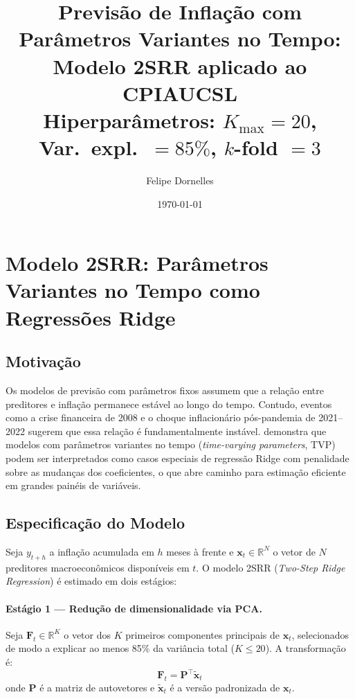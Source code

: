 \documentclass[12pt, a4paper]{article}
\begin{document}
\title{\textbf{Previsão de Inflação com Parâmetros Variantes no Tempo:\\
       Modelo 2SRR aplicado ao CPIAUCSL}\\[0.5em]
       \large Hiperparâmetros: $K_{\max}=20$,
       Var.\ expl.\ $= 85\%$, $k$-fold $= 3$}
\author{Felipe Dornelles}
\date{\today}
\maketitle
\tableofcontents
\newpage

\section{Modelo 2SRR: Parâmetros Variantes no Tempo como Regressões Ridge}
\label{sec:2srr}

\subsection{Motivação}

Os modelos de previsão com parâmetros fixos assumem que a relação entre
preditores e inflação permanece estável ao longo do tempo. Contudo,
eventos como a crise financeira de 2008 e o choque inflacionário
pós-pandemia de 2021--2022 sugerem que essa relação é fundamentalmente
instável. \citet{Coulombe2021} demonstra que modelos com parâmetros
variantes no tempo (\textit{time-varying parameters}, TVP) podem ser
interpretados como casos especiais de regressão Ridge com penalidade
sobre as mudanças dos coeficientes, o que abre caminho para estimação
eficiente em grandes painéis de variáveis.

\subsection{Especificação do Modelo}

Seja $y_{t+h}$ a inflação acumulada em $h$ meses à frente e
$\mathbf{x}_t \in \mathbb{R}^N$ o vetor de $N$ preditores
macroeconômicos disponíveis em $t$. O modelo 2SRR
(\textit{Two-Step Ridge Regression}) é estimado em dois estágios:

\paragraph{Estágio 1 — Redução de dimensionalidade via PCA.}
Seja $\mathbf{F}_t \in \mathbb{R}^K$ o vetor dos $K$ primeiros
componentes principais de $\mathbf{x}_t$, selecionados de modo a
explicar ao menos 85\% da variância total ($K \leq 20$). A
transformação é:
\[
  \mathbf{F}_t = \mathbf{P}^\top \tilde{\mathbf{x}}_t
\]
onde $\mathbf{P}$ é a matriz de autovetores e $\tilde{\mathbf{x}}_t$
é a versão padronizada de $\mathbf{x}_t$.
\end{document}

